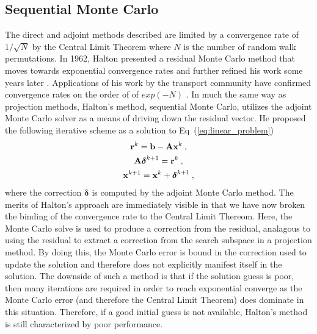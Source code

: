 \subsection{Sequential Monte Carlo}
\label{subsec:sequential_mc}
The direct and adjoint methods described are limited by a convergence
rate of $1/\sqrt{N}$ by the Central Limit Theorem where $N$ is the
number of random walk permutations. In 1962, Halton presented a
residual Monte Carlo method that moves towards exponential convergence
rates \citep{halton_sequential_1962} and further refined his work some
years later \citep{halton_sequential_1994}. Applications of his work
by the transport community have confirmed convergence rates on the
order of of $exp(-N)$
\citep{evans_residual_2003}. In
much the same way as projection methods, Halton's method, sequential
Monte Carlo, utilizes the adjoint Monte Carlo solver as a means of
driving down the residual vector. He proposed the following iterative
scheme as a solution to Eq~(\ref{eq:linear_problem})\:
\begin{subequations}
  \begin{gather}
    \mathbf{r}^k = \mathbf{b} - \mathbf{A}\mathbf{x}^k\:,\\  
    \mathbf{A}\boldsymbol{\delta}^{k+1} = \mathbf{r}^{k}\:,\\
    \mathbf{x}^{k+1} = \mathbf{x}^k + \boldsymbol{\delta}^{k+1}\:,
  \end{gather}
  \label{eq:sequential_monte_carlo}
\end{subequations}
where the correction $\boldsymbol{\delta}$ is computed by the adjoint
Monte Carlo method. The merits of Halton's approach are immediately
visible in that we have now broken the binding of the convergence rate
to the Central Limit Thereom. Here, the Monte Carlo solve is used to
produce a correction from the residual, analagous to using the
residual to extract a correction from the search subspace in a
projection method. By doing this, the Monte Carlo error is bound in
the correction used to update the solution and therefore does not
explicitly manifest itself in the solution. The downside of such a
method is that if the solution guess is poor, then many iterations are
required in order to reach exponential converge as the Monte Carlo
error (and therefore the Central Limit Theorem) does dominate in this
situation. Therefore, if a good initial guess is not available,
Halton's method is still characterized by poor performance.

